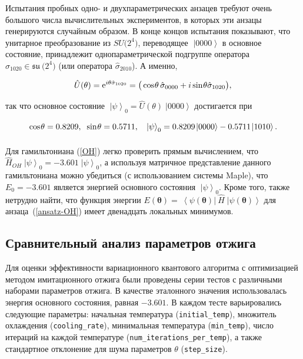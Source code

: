 \documentclass[a4paper]{report}
\newcommand{\ket}[1] {\!\!\;\ensuremath{\left|#1\right\rangle}}
\newcommand{\bra}[1] {\!\!\:\ensuremath{\left\langle#1\right|\!\!\:}}
\begin{document}
Испытания пробных одно- и двухпараметрических анзацев требуют очень большого числа вычислительных экспериментов, в которых эти анзацы генерируются случайным образом. В конце концов испытания показывают, что унитарное преобразование из $SU\!\big(2^4\big)$, переводящее $\ket{0000}$ в основное состояние, принадлежит однопараметрической подгруппе оператора ${\hat{\sigma}_{1020}\!\in\! \mathfrak{su}\:\!\!\big(2^4\big)}$ (или оператора ${\hat{\sigma}_{2010}}$). А именно,
\begin{equation*}
  \hat{U}(\theta)= \mathrm{e}^{i\theta\hat{\sigma}_{1020}}= \big(\cos\:\!\!\theta\,\hat{\sigma}_{0000}+ i\sin\:\!\!\theta\hat{\sigma}_{1020}\big),
  \vphantom{\int}
\end{equation*}
так что основное состояние ${\ket{\psi}_0= \hat{U}(\theta)\ket{0000}}$ достигается при
\begin{equation*}
\cos\:\!\!\theta= 0.8209,\;\; \sin\:\!\!\theta= 0.5711,\quad  \ket{\psi}_0= 0.8209\ket{0000}- 0.5711\ket{1010}.
\vphantom{\int}
\end{equation*}

Для гамильтониана (\ref{OH}) легко проверить прямым вычислением, что ${\hat{H}_{\scriptscriptstyle OH}\ket{\psi}_0= -3.601\ket{\psi}_0}$, а используя матричное представление данного гамильтониана можно убедиться (с использованием системы Maple), что ${E_{0}=-3.601}$ является энергией основного состояния ${\ket{\psi}_0}$. Кроме того, также нетрудно найти, что функция энергии $E(\bm\theta)= \bra{\psi(\bm\theta)}\hat{H} \ket{\psi(\bm\theta)}$ для анзаца~(\ref{ansatz-OH}) имеет двенадцать локальных минимумов.


\subsection{Сравнительный анализ параметров отжига}

Для оценки эффективности вариационного квантового алгоритма с оптимизацией методом имитационного отжига были проведены серии тестов с различными наборами параметров отжига. В качестве эталонного значения использовалась энергия основного состояния, равная $-3.601$. В каждом тесте варьировались следующие параметры: начальная температура (\texttt{initial\_temp}), множитель охлаждения (\texttt{cooling\_rate}), минимальная температура (\texttt{min\_temp}), число итераций на каждой температуре (\texttt{num\_iterations\_per\_temp}), а также стандартное отклонение для шума параметров $\theta$ (\texttt{step\_size}).
\end{document}
